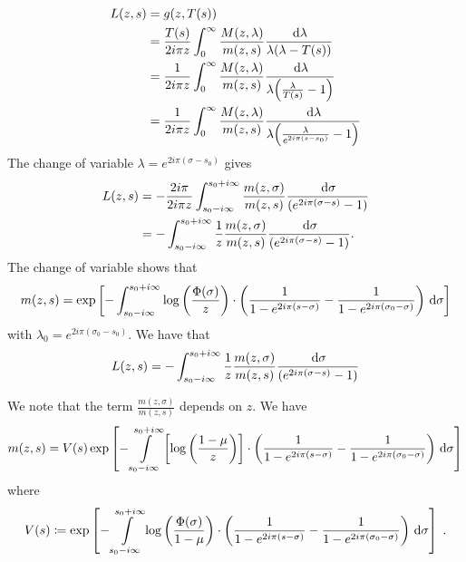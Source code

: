 \begin{align*}
    L(z,s) &= g(z,T(s)) \\ 
    &= 
    \frac{T(s)}{2i \pi z}\int_0^\infty  \frac{M(z,\lambda)}{m(z,s)} \frac{\,\mathrm{d} \lambda}{\lambda(\lambda-T(s))} \\
    &= 
    \frac{1}{2i\pi z}\int_0^\infty  \frac{M(z,\lambda)}{m(z,s)} \frac{\,\mathrm{d} \lambda}{\lambda\Big(\frac{\lambda}{T(s)}-1\Big)} \\
    &= 
    \frac{1}{2i\pi z}\int_0^\infty  \frac{M(z,\lambda)}{m(z,s)} \frac{\,\mathrm{d} \lambda}{\lambda\Big(\frac{\lambda}{e^{2i\pi(s-s_0)}}-1\Big)} \\
\end{align*}
The change of variable $\lambda = e^{2i\pi(\sigma-s_0)}$ gives
\begin{align*}
    L(z,s)
    &= 
    - \frac{2i\pi }{2i\pi z}\int_{s_0-i\infty}^{s_0+i\infty}  \frac{m(z,\sigma)}{m(z,s)} \frac{\,\mathrm{d} \sigma}{(e^{2i\pi(\sigma-s)}-1)} \\
    &= 
   - \int_{s_0-i\infty}^{s_0+i\infty} \frac{1}{z}  \frac{m(z,\sigma)}{m(z,s)} \frac{\,\mathrm{d} \sigma}{(e^{2i\pi(\sigma-s)}-1)}. 
\end{align*}
The change of variable shows that
\begin{equation}
    m(z,s) = \exp \left[
    - \int_{s_0-i\infty}^{s_0+i\infty}\log \left( \frac{\Phi(
    \sigma)}{z}\right)
    \cdot \left(
        \frac{1}{1-e^{2i\pi(s-\sigma)}} - \frac{1}{1-e^{2i\pi(\sigma_0-\sigma)}}
     \right) \,\mathrm{d} \sigma
    \right]
\end{equation} 
with $\lambda_0 = e^{2i\pi(\sigma_0 - s_0)}$. 
We have that 
\begin{equation}
    L(z,s) 
    = 
   - \int_{s_0-i\infty}^{s_0+i\infty} \frac{1}{z}  \frac{m(z,\sigma)}{m(z,s)} \frac{\,\mathrm{d} \sigma}{(e^{2i\pi(\sigma-s)}-1)}
\end{equation}

We note that the term $\frac{m(z,\sigma)}{m(z,s)}$ depends on $z$.%
We have
\begin{equation}
    m(z,s) = V(s)
    \exp \left[
    - \int\limits_{s_0-i\infty}^{s_0+i\infty} \left[\log \left( \frac{1-\mu}{z}\right)\right]
    \cdot \left(
        \frac{1}{1-e^{2i\pi(s-\sigma)}} - \frac{1}{1-e^{2i\pi(\sigma_0-\sigma)}}
     \right) \,\mathrm{d} \sigma
    \right]
    \label{eq:uselogbranch}
\end{equation}
where 
\begin{equation}
V(s) \coloneqq \exp \left[
    - \int\limits_{s_0-i\infty}^{s_0+i\infty}\log \left( \frac{\Phi(\sigma)}{1-\mu}\right)
    \cdot \left(
        \frac{1}{1-e^{2i\pi(s-\sigma)}} - \frac{1}{1-e^{2i\pi(\sigma_0-\sigma)}}
     \right) \,\mathrm{d} \sigma 
    \right]
    \; .
\end{equation}

